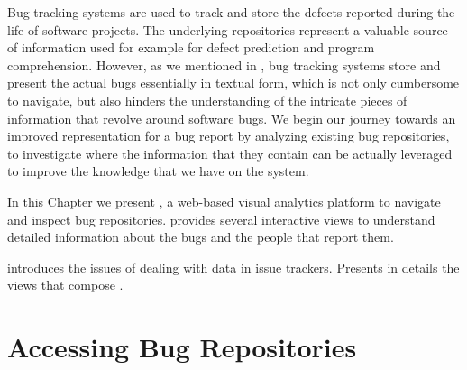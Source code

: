 





Bug tracking systems are used to track and store the defects reported during the life of software projects.
The underlying repositories represent a valuable source of information used for example for defect prediction and program comprehension.
However, as we mentioned in , bug tracking systems store and present the actual bugs essentially in textual form, which is not only cumbersome to navigate, but also hinders the understanding of the intricate pieces of information that revolve around software bugs.
We begin our journey towards an improved representation for a bug report by analyzing existing bug repositories, to investigate where the information that they contain can be actually leveraged to improve the knowledge that we have on the system.

In this Chapter we present \ib, a web-based visual analytics platform to navigate and inspect bug repositories.
\ib provides several interactive views to understand detailed information about the bugs and the people that report them.


\structure

 introduces the issues of dealing with data in issue trackers.
 Presents in details the views that compose \ib.

\newpage

\section{Accessing Bug Repositories}\label{sec:visualize-intro}

